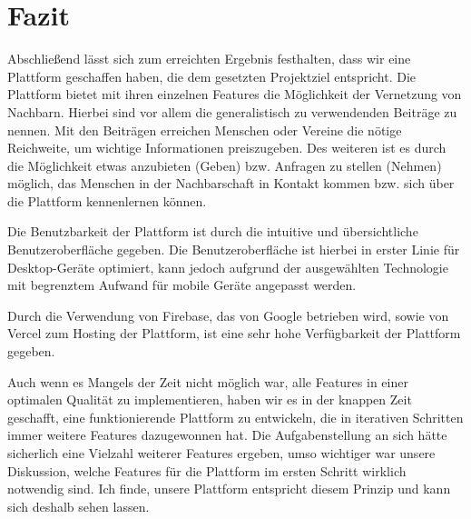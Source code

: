 \chapter{Fazit}
\label{ch:conclusion}

Abschließend lässt sich zum erreichten Ergebnis festhalten, dass wir eine Plattform geschaffen haben, die dem gesetzten Projektziel entspricht. Die Plattform bietet mit ihren einzelnen Features die Möglichkeit der Vernetzung von Nachbarn. Hierbei sind vor allem die generalistisch zu verwendenden Beiträge zu nennen. Mit den Beiträgen erreichen Menschen oder Vereine die nötige Reichweite, um wichtige Informationen preiszugeben. Des weiteren ist es durch die Möglichkeit etwas anzubieten (Geben) bzw. Anfragen zu stellen (Nehmen) möglich, das Menschen in der Nachbarschaft in Kontakt kommen bzw. sich über die Plattform kennenlernen können.

Die Benutzbarkeit der Plattform ist durch die intuitive und übersichtliche Benutzeroberfläche gegeben. Die Benutzeroberfläche ist hierbei in erster Linie für Desktop-Geräte optimiert, kann jedoch aufgrund der ausgewählten Technologie mit begrenztem Aufwand für mobile Geräte angepasst werden.

Durch die Verwendung von Firebase, das von Google betrieben wird, sowie von Vercel zum Hosting der Plattform, ist eine sehr hohe Verfügbarkeit der Plattform gegeben.

Auch wenn es Mangels der Zeit nicht möglich war, alle Features in einer optimalen Qualität zu implementieren, haben wir es in der knappen Zeit geschafft, eine funktionierende Plattform zu entwickeln, die in iterativen Schritten immer weitere Features dazugewonnen hat. Die Aufgabenstellung an sich hätte sicherlich eine Vielzahl weiterer Features ergeben, umso wichtiger war unsere Diskussion, welche Features für die Plattform im ersten Schritt wirklich notwendig sind. Ich finde, unsere Plattform entspricht diesem Prinzip und kann sich deshalb sehen lassen.
